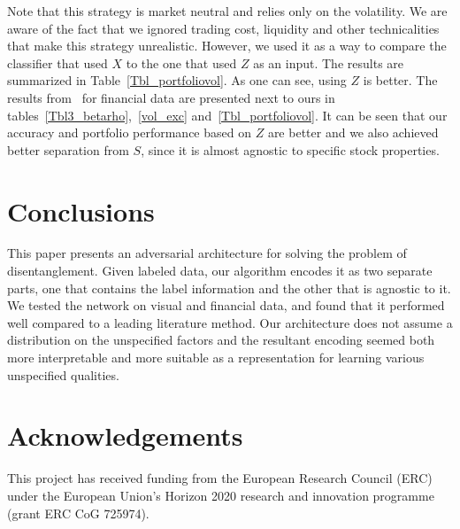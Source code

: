 \documentclass[10pt,twocolumn,letterpaper]{article}
\begin{document}
Note that this strategy is market neutral and relies only on the volatility. We are aware of the fact that we ignored trading cost, liquidity and other technicalities that make this strategy unrealistic. However, we used it as a way to compare the classifier that used $X$ to the one that used $Z$ as an input. The  results are summarized in Table~\ref{Tbl_portfoliovol}. As one can see, using $Z$ is better. 
The results from~\cite{disentanglement} for financial data are presented next to ours in tables~\ref{Tbl3_betarho},~\ref{vol_exc} and~\ref{Tbl_portfoliovol}. It can be seen that our accuracy and portfolio performance based on $Z$ are better and we also achieved better separation from $S$, since it is almost agnostic to specific stock properties.

\section{Conclusions}
This paper presents an adversarial architecture for solving the problem of disentanglement. Given labeled data, our algorithm encodes it as two separate parts, one that contains the label information and the other that is agnostic to it. We tested the network on visual and financial data, and found that it performed well compared to a leading literature method. Our architecture does not assume a distribution on the unspecified factors and the resultant encoding seemed both more interpretable and more suitable as a representation for learning various unspecified qualities.

\section*{Acknowledgements}

This project has received funding from the European Research Council (ERC) under the European Union's Horizon 2020 research and innovation programme (grant ERC CoG 725974).


\clearpage
{\small


}
\end{document}
